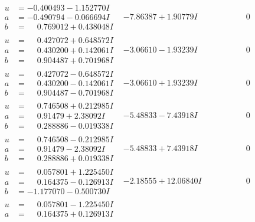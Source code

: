 \documentclass[1p]{elsarticle_modified}
\theoremstyle{definition}
\begin{document}
$$\begin{array}{c|c|c}
 \hline 
\begin{aligned}
u &= -0.400493 - 1.152770 I \\
a &= -0.490794 - 0.066694 I \\
b &= \phantom{-}0.769012 + 0.438048 I\end{aligned}
 & -7.86387 + 1.90779 I & \phantom{-0.000000 } 0 \\ \hline\begin{aligned}
u &= \phantom{-}0.427072 + 0.648572 I \\
a &= \phantom{-}0.430200 + 0.142061 I \\
b &= \phantom{-}0.904487 + 0.701968 I\end{aligned}
 & -3.06610 - 1.93239 I & \phantom{-0.000000 } 0 \\ \hline\begin{aligned}
u &= \phantom{-}0.427072 - 0.648572 I \\
a &= \phantom{-}0.430200 - 0.142061 I \\
b &= \phantom{-}0.904487 - 0.701968 I\end{aligned}
 & -3.06610 + 1.93239 I & \phantom{-0.000000 } 0 \\ \hline\begin{aligned}
u &= \phantom{-}0.746508 + 0.212985 I \\
a &= \phantom{-}0.91479 + 2.38092 I \\
b &= \phantom{-}0.288886 - 0.019338 I\end{aligned}
 & -5.48833 - 7.43918 I & \phantom{-0.000000 } 0 \\ \hline\begin{aligned}
u &= \phantom{-}0.746508 - 0.212985 I \\
a &= \phantom{-}0.91479 - 2.38092 I \\
b &= \phantom{-}0.288886 + 0.019338 I\end{aligned}
 & -5.48833 + 7.43918 I & \phantom{-0.000000 } 0 \\ \hline\begin{aligned}
u &= \phantom{-}0.057801 + 1.225450 I \\
a &= \phantom{-}0.164375 - 0.126913 I \\
b &= -1.177070 - 0.500730 I\end{aligned}
 & -2.18555 + 12.06840 I & \phantom{-0.000000 } 0 \\ \hline\begin{aligned}
u &= \phantom{-}0.057801 - 1.225450 I \\
a &= \phantom{-}0.164375 + 0.126913 I \\

\end{aligned}
\end{array}$$
\end{document}
